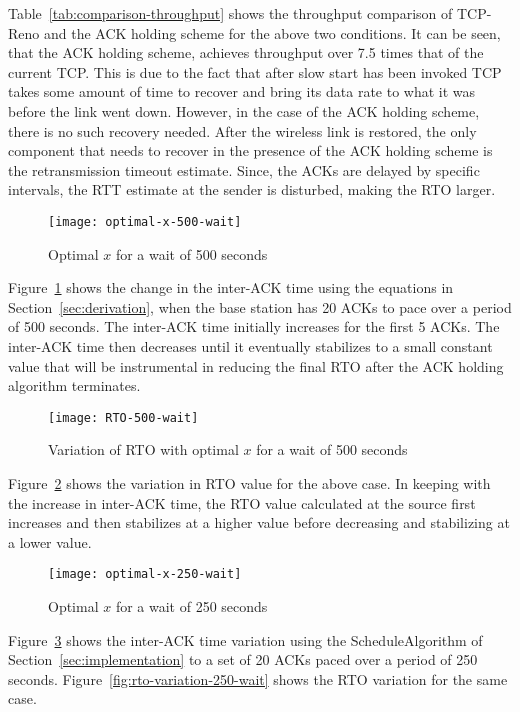 \documentclass[conference]{IEEEtran}
\begin{document}
Table~\ref{tab:comparison-throughput} shows the throughput comparison of TCP-Reno and the ACK holding scheme for the above two conditions. It can be seen, that the ACK holding scheme, achieves throughput over 7.5 times that of the current TCP. This is due to the fact that after slow start has been invoked TCP takes some amount of time to recover and bring its data rate to what it was before the link went down. However, in the case of the ACK holding scheme, there is no such recovery needed. After the wireless link is restored, the only component that needs to recover in the presence of the ACK holding scheme is the retransmission timeout estimate. Since, the ACKs are delayed by specific intervals, the RTT estimate at the sender is disturbed, making the RTO larger. 
\begin{figure}
  \centering
  \texttt{[image: optimal-x-500-wait]}
  \caption{Optimal $x$ for a wait of 500 seconds}
  \label{fig:optimal-x-500-wait}
\end{figure}

Figure~\ref{fig:optimal-x-500-wait} shows the change in the inter-ACK time using the equations in Section~\ref{sec:derivation}, when the base station has 20 ACKs to pace over a period of 500 seconds. The inter-ACK time initially increases for the first 5 ACKs. The inter-ACK time then decreases until it eventually stabilizes to a small constant value that will be instrumental in reducing the final RTO after the ACK holding algorithm terminates.

\begin{figure}
  \centering
  \texttt{[image: RTO-500-wait]}
  \caption{Variation of RTO with optimal $x$ for a wait of 500 seconds}
  \label{fig:rto-variation-500-wait}
\end{figure}
Figure~\ref{fig:rto-variation-500-wait} shows the variation in RTO value for the above case. In keeping with the increase in inter-ACK time, the RTO value calculated at the source first increases and then stabilizes at a higher value before decreasing and stabilizing at a lower value.
\begin{figure}
  \centering
  \texttt{[image: optimal-x-250-wait]}
  \caption{Optimal $x$ for a wait of 250 seconds}
  \label{fig:optimal-x-250-wait}
\end{figure}
Figure~\ref{fig:optimal-x-250-wait} shows the inter-ACK time variation using the ScheduleAlgorithm of Section~\ref{sec:implementation} to a set of 20 ACKs paced over a period of 250 seconds. Figure~\ref{fig:rto-variation-250-wait} shows the RTO variation for the same case.
\end{document}
